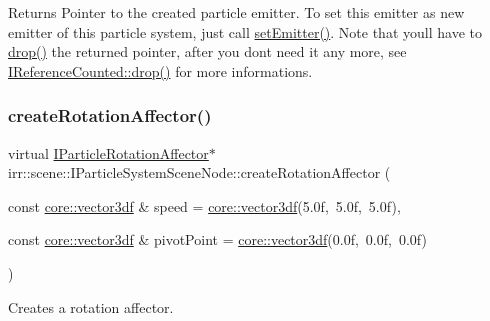 \begin{DoxyReturn}{Returns}
Pointer to the created particle emitter. To set this emitter as new emitter of this particle system, just call \hyperlink{classirr_1_1scene_1_1IParticleSystemSceneNode_aececff4531482ce976f1859c40bf3f76}{set\+Emitter()}. Note that you\textquotesingle{}ll have to \hyperlink{classirr_1_1IReferenceCounted_a03856a09355b89d178090c4a5f738543}{drop()} the returned pointer, after you don\textquotesingle{}t need it any more, see \hyperlink{classirr_1_1IReferenceCounted_a03856a09355b89d178090c4a5f738543}{I\+Reference\+Counted\+::drop()} for more informations. 
\end{DoxyReturn}
\mbox{\label{classirr_1_1scene_1_1IParticleSystemSceneNode_a7a09b7ebc0d4a2d164233c42689623d6}} 
\subsubsection{\texorpdfstring{create\+Rotation\+Affector()}{createRotationAffector()}\hspace{0.1cm}{\footnotesize\ttfamily [1/2]}}
{\footnotesize\ttfamily virtual \hyperlink{classirr_1_1scene_1_1IParticleRotationAffector}{I\+Particle\+Rotation\+Affector}$\ast$ irr\+::scene\+::\+I\+Particle\+System\+Scene\+Node\+::create\+Rotation\+Affector (\begin{DoxyParamCaption}\item[{const \hyperlink{namespaceirr_1_1core_ae6e2b2a6c552833ebbd5b7463d03586b}{core\+::vector3df} \&}]{speed = {\ttfamily \hyperlink{namespaceirr_1_1core_ae6e2b2a6c552833ebbd5b7463d03586b}{core\+::vector3df}(5.0f,~5.0f,~5.0f)},  }\item[{const \hyperlink{namespaceirr_1_1core_ae6e2b2a6c552833ebbd5b7463d03586b}{core\+::vector3df} \&}]{pivot\+Point = {\ttfamily \hyperlink{namespaceirr_1_1core_ae6e2b2a6c552833ebbd5b7463d03586b}{core\+::vector3df}(0.0f,~0.0f,~0.0f)} }\end{DoxyParamCaption})\hspace{0.3cm}{\ttfamily [pure virtual]}}



Creates a rotation affector. 

